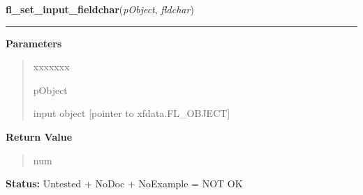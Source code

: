 \hspace{.8\funcindent}\begin{boxedminipage}{\funcwidth}

    \raggedright \textbf{fl\_set\_input\_fieldchar}(\textit{pObject}, \textit{fldchar})

    \vspace{-1.5ex}

    \rule{\textwidth}{0.5\fboxrule}
\setlength{\parskip}{2ex}
\setlength{\parskip}{1ex}
      \textbf{Parameters}
      \vspace{-1ex}

      \begin{quote}
        \begin{Ventry}{xxxxxxx}

          \item[pObject]

          input object [pointer to xfdata.FL\_OBJECT]

        \end{Ventry}

      \end{quote}

      \textbf{Return Value}
    \vspace{-1ex}

      \begin{quote}
      num

      \end{quote}

\textbf{Status:} Untested + NoDoc + NoExample = NOT OK



    \end{boxedminipage}

    \label{xformslib:library:fl_get_input_topline}

    \vspace{0.5ex}

